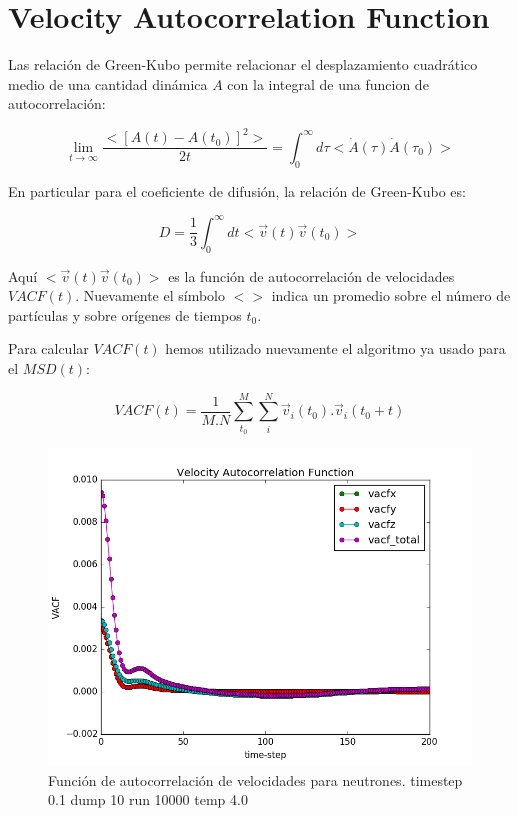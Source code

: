 \documentclass[
 reprint,
 amsmath,amssymb,
 aps,
 a4paper
]{revtex4-1}
\begin{document}
\section{\label{seq:vaf}Velocity Autocorrelation Function}

Las relación de Green-Kubo permite relacionar el desplazamiento cuadrático medio de una cantidad dinámica $A$ con la integral de una funcion de autocorrelación:

 \begin{equation}\label{eq:GK}
 \lim_{t \to \infty} \frac{<[A(t)-A(t_0)]^2>}{2t}=\int_{0}^{\infty}d\tau<\dot{A}(\tau)\dot{A}(\tau_0)>
\end{equation}

En particular para el coeficiente de difusión, la relación de Green-Kubo es:

 \begin{equation}\label{eq:GK_D}
 D=\frac{1}{3}\int_{0}^{\infty}dt<\vec{v}(t)\vec{v}(t_0)>
\end{equation}

Aquí $<\vec{v}(t)\vec{v}(t_0)>$ es la función de autocorrelación de velocidades $VACF(t)$. Nuevamente el símbolo $<>$ indica un promedio sobre el número de partículas y sobre orígenes de tiempos $t_0$.

Para calcular $VACF(t)$ hemos utilizado nuevamente el algoritmo ya usado para el $MSD(t)$:

\begin{equation}\label{eq:MSD}
VACF(t)=\frac{1}{M.N}\sum_{t_0}^{M}\sum_{i}^{N}\vec{v}_i(t_0).\vec{v}_i(t_0+t)
\end{equation}

\begin{figure}[H]
\centerline{
  \includegraphics[width=1.0\linewidth]{vacf_N_200.png}}
  \caption{\small Función de autocorrelación de velocidades para neutrones. timestep 0.1 dump 10 run 10000 temp 4.0}
  \label{fig:vacf_N_200}
\end{figure}
\end{document}
